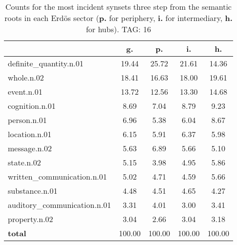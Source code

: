 \begin{table}[h!]
\begin{center}
\begin{tabular}{| l | c | c | c | c |}\hline
 & g. & p. & i. & h. \\\hline
definite\_quantity.n.01 & 19.44  & 25.72  & 21.61  & 14.36 \\\hline
whole.n.02 & 18.41  & 16.63  & 18.00  & 19.61 \\\hline
event.n.01 & 13.72  & 12.56  & 13.30  & 14.68 \\\hline
cognition.n.01 & 8.69  & 7.04  & 8.79  & 9.23 \\\hline
person.n.01 & 6.96  & 5.38  & 6.04  & 8.67 \\\hline
location.n.01 & 6.15  & 5.91  & 6.37  & 5.98 \\\hline
message.n.02 & 5.63  & 6.89  & 5.66  & 5.10 \\\hline
state.n.02 & 5.15  & 3.98  & 4.95  & 5.86 \\\hline
written\_communication.n.01 & 5.02  & 4.71  & 4.59  & 5.66 \\\hline
substance.n.01 & 4.48  & 4.51  & 4.65  & 4.27 \\\hline
auditory\_communication.n.01 & 3.31  & 4.01  & 3.00  & 3.41 \\\hline
property.n.02 & 3.04  & 2.66  & 3.04  & 3.18 \\\hline
{{\bf total}} & 100.00  & 100.00  & 100.00  & 100.00 \\\hline
\end{tabular}
\caption{Counts for the most incident synsets three step from the semantic roots in each Erd\"os sector ({\bf p.} for periphery, {\bf i.} for intermediary, {\bf h.} for hubs). TAG: 16}
\end{center}
\end{table}